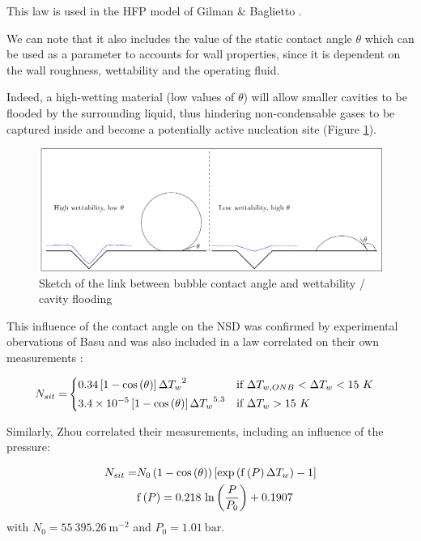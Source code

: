 \begin{remark*}{}
This law is used in the HFP model of Gilman \& Baglietto \cite{gilman_baglietto}.
\end{remark*}

We can note that it also includes the value of the static contact angle $\theta$ which can be used as a parameter to accounts for wall properties, since it is dependent on the wall roughness, wettability and the operating fluid. 

Indeed, a high-wetting material (low values of $\theta$) will allow smaller cavities to be flooded by the surrounding liquid, thus hindering non-condensable gases to be captured inside and become a potentially active nucleation site (Figure \ref{fig:nsd_theta_wet}).

\begin{figure}[h!]
\centering
\includegraphics[scale=0.8]{img/NSD/wettability.pdf}
\caption{Sketch of the link between bubble contact angle and wettability / cavity flooding}
\label{fig:nsd_theta_wet}
\end{figure}

This influence of the contact angle on the NSD was confirmed by experimental obervations of Basu \etal \cite{basu_nsit} and was also included in a law correlated on their own measurements :

\begin{align}
N_{sit}=&
\begin{dcases}
0.34\left[ 1-\mathrm{cos}\left( \theta \right) \right] {\Delta T_{w}}^{2} & \text{if } \Delta T_{w,ONB}<\Delta T_{w} < 15\ K\\
3.4\times 10^{-5}\left[ 1-\mathrm{cos}\left( \theta \right) \right] {\Delta T_{w}}^{5.3} & \text{if } \Delta T_{w} > 15\ K
\end{dcases}
\label{eq:nsit_basu}
\end{align}

\npar

Similarly, Zhou \etal \cite{zhou_nsd} correlated their measurements, including an influence of the pressure:

\begin{align}
N_{sit} =& N_{0}\left( 1-\mathrm{cos}\left( \theta \right) \right)\left[ \mathrm{exp}\left( \mathrm{f}\left( P \right) \Delta T_{w}  \right) -1  \right]
\label{eq:nsit_zhou}\\
&\mathrm{f}\left( P \right) = 0.218~\mathrm{ln}\left( \dfrac{P}{P_{0}} \right)+0.1907
\end{align}
with $N_{0}=55~395.26\ \mathrm{m}^{-2}$ and $P_{0}=1.01\ \mathrm{bar}$.

